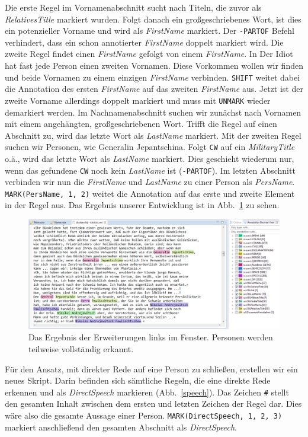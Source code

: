 \documentclass{article}
\begin{document}
Die erste Regel im Vornamenabschnitt sucht nach Titeln, die zuvor als \textit{RelativesTitle} markiert wurden. Folgt danach ein großgeschriebenes Wort, ist dies ein potenzieller Vorname und wird als \textit{FirstName} markiert. Der \texttt{-PARTOF} Befehl verhindert, dass ein schon annotierter \textit{FirstName} doppelt markiert wird. Die zweite Regel findet einen \textit{FirstName} gefolgt von einem \textit{FirstName}. In \glqq Der Idiot\grqq{} hat fast jede Person einen zweiten Vornamen. Diese Vorkommen wollen wir finden und beide Vornamen zu einem einzigen \textit{FirstName} verbinden. \texttt{SHIFT} weitet dabei die Annotation des ersten \textit{FirstName} auf das zweiten \textit{FirstName} aus. Jetzt ist der zweite Vorname allerdings doppelt markiert und muss mit \texttt{UNMARK} wieder demarkiert werden. Im Nachnamenabschnitt suchen wir zunächst nach Vornamen mit einem angehängten, großgeschriebenen Wort. Trifft die Regel auf einen Abschnitt zu, wird das letzte Wort als \textit{LastName} markiert. Mit der zweiten Regel suchen wir Personen, wie \glqq Generalin Jepantschina\grqq{}. Folgt \texttt{CW} auf ein \textit{MilitaryTitle} o.ä., wird das letzte Wort als \textit{LastName} markiert. Dies geschieht wiederum nur, wenn das gefundene \texttt{CW} noch kein \textit{LastName} ist (\texttt{-PARTOF}). Im letzten Abschnitt verbinden wir nun die \textit{FirstName} und \textit{LastName} zu einer Person als \textit{PersName}. \texttt{MARK(PersName, 1, 2)} weitet die Annotation auf das erste und zweite Element in der Regel aus. Das Ergebnis unserer Entwicklung ist in Abb.~\ref{ano} zu sehen.

\begin{figure}
\centering
\includegraphics[width=1\textwidth]{figs/tt_ano.png}
\caption{Das Ergebnis der Erweiterungen links im Fenster. Personen werden teilweise vollständig erkannt.}
\label{ano}
\end{figure}

Für den Ansatz, mit direkter Rede auf eine Person zu schließen, erstellen wir ein neues Skript. Darin befinden sich sämtliche Regeln, die eine direkte Rede erkennen und als \textit{DirectSpeech} markieren (Abb.~\ref{speech}). Das Zeichen \texttt{\#} stellt den gesamten Inhalt zwischen dem ersten und letzten Zeichen der Regel dar. Dies wäre also die gesamte Aussage einer Person. \texttt{MARK(DirectSpeech, 1, 2, 3)} markiert anschließend den gesamten Abschnitt als \textit{DirectSpeech}.
\end{document}
